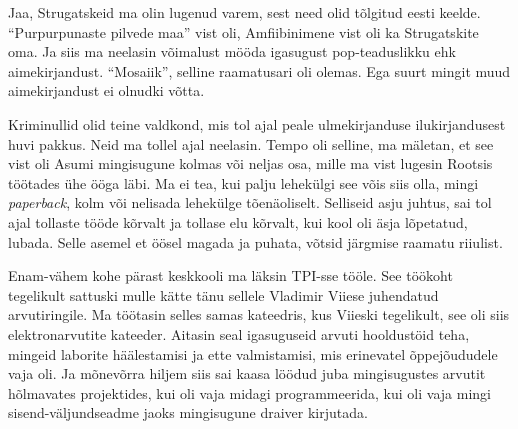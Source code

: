 Jaa, Strugatskeid ma olin lugenud varem, sest need olid tõlgitud eesti keelde. 
\enquote{Purpurpunaste pilvede maa} vist oli,  Amfiibinimene vist oli ka 
Strugatskite oma. Ja siis ma neelasin võimalust mööda igasugust pop-teaduslikku ehk 
aimekirjandust. \enquote{Mosaiik}, selline raamatusari oli olemas. Ega suurt mingit muud 
aimekirjandust ei olnudki võtta.

Kriminullid olid teine valdkond, mis tol ajal peale  ulmekirjanduse 
ilukirjandusest huvi pakkus. Neid ma tollel ajal neelasin. Tempo oli selline, 
ma mäletan, et see vist oli Asumi mingisugune kolmas või neljas osa, mille ma 
vist lugesin Rootsis töötades ühe ööga läbi. Ma ei tea, kui palju lehekülgi see 
võis siis olla, mingi \emph{paperback}, kolm või nelisada lehekülge 
tõenäoliselt. Selliseid asju juhtus, sai tol ajal tollaste tööde kõrvalt ja 
tollase elu kõrvalt, kui  kool oli äsja lõpetatud, lubada. Selle asemel et 
öösel magada ja puhata, võtsid järgmise raamatu riiulist.


Enam-vähem kohe pärast keskkooli ma läksin TPI-sse tööle. See töökoht tegelikult sattuski mulle kätte tänu sellele 
Vladimir Viiese juhendatud arvutiringile. Ma 
töötasin selles samas kateedris, kus Viieski tegelikult, see oli siis 
elektronarvutite kateeder. Aitasin seal igasuguseid arvuti hooldustöid teha, mingeid laborite 
häälestamisi ja  ette valmistamisi, mis erinevatel õppejõududele vaja oli. Ja 
mõnevõrra hiljem siis sai kaasa löödud juba mingisugustes arvutit hõlmavates 
projektides,  kui oli vaja midagi programmeerida, kui oli vaja mingi 
sisend-väljundseadme jaoks mingisugune draiver kirjutada. 


